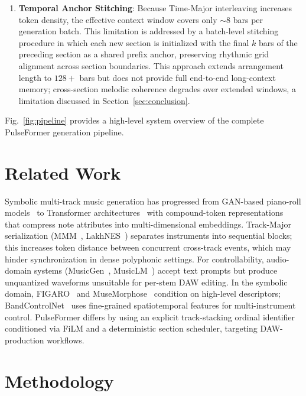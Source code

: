 \documentclass[pdflatex,sn-mathphys-num,twocolumn]{sn-jnl}
\theoremstyle{thmstyleone}
\theoremstyle{thmstyletwo}
\begin{document}
\begin{enumerate}
    \item \textbf{Temporal Anchor Stitching}: Because Time-Major interleaving increases token density, the effective context window covers only $\sim$8 bars per generation batch. This limitation is addressed by a batch-level stitching procedure in which each new section is initialized with the final $k$ bars of the preceding section as a shared prefix anchor, preserving rhythmic grid alignment across section boundaries. This approach extends arrangement length to $128+$ bars but does not provide full end-to-end long-context memory; cross-section melodic coherence degrades over extended windows, a limitation discussed in Section~\ref{sec:conclusion}.
\end{enumerate}

Fig.~\ref{fig:pipeline} provides a high-level system overview of the complete PulseFormer generation pipeline.




\section{Related Work}
\label{sec:related_work}

Symbolic multi-track music generation has progressed from GAN-based piano-roll models~\cite{dong2018musegan} to Transformer architectures~\cite{huang2019music, huang2020remi} with compound-token representations~\cite{hsiao2021compound, zeng2021musicbert} that compress note attributes into multi-dimensional embeddings. Track-Major serialization (MMM~\cite{ens2020mmm}, LakhNES~\cite{donahue2019lakhnes}) separates instruments into sequential blocks; this increases token distance between concurrent cross-track events, which may hinder synchronization in dense polyphonic settings.
For controllability, audio-domain systems (MusicGen~\cite{copet2023simple}, MusicLM~\cite{agostinelli2023musiclm}) accept text prompts but produce unquantized waveforms unsuitable for per-stem DAW editing. In the symbolic domain, FIGARO~\cite{von2022figaro} and MuseMorphose~\cite{wu2023musemorphose} condition on high-level descriptors; BandControlNet~\cite{luo2024bandcontrolnet} uses fine-grained spatiotemporal features for multi-instrument control. PulseFormer differs by using an explicit track-stacking ordinal identifier conditioned via FiLM and a deterministic section scheduler, targeting DAW-production workflows.

\section{Methodology}
\label{sec:methodology}
\end{document}
